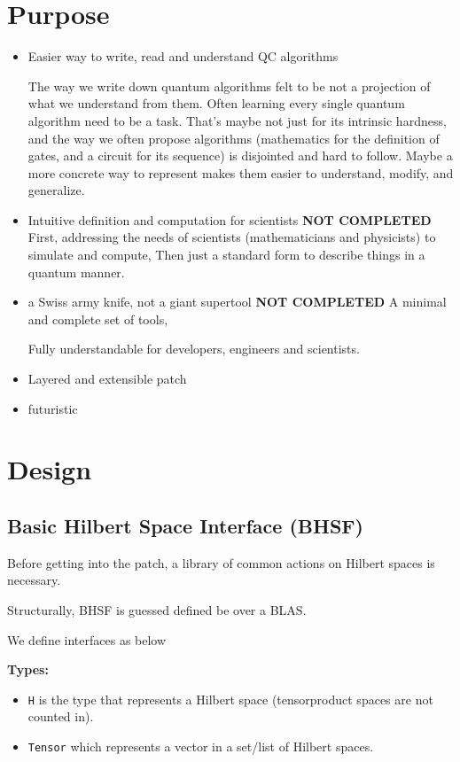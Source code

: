 \documentclass[a4paper,11pt]{article}
\def\co{\lstinline}
\begin{document}
\section{Purpose}
\begin{itemize}
\item Easier way to write, read and understand QC algorithms

The way we write down quantum algorithms felt to be not a projection of what we understand from them. Often learning every single quantum algorithm need to be a task. That's maybe not just for its intrinsic hardness, and the way we often propose algorithms (mathematics for the definition of gates, and a circuit for its sequence) is disjointed and hard to follow. Maybe a more concrete way to represent makes them easier to understand, modify, and generalize.


\item Intuitive definition and computation for scientists
\textbf{NOT COMPLETED}
First, addressing the needs of scientists (mathematicians and physicists) to simulate and compute,
Then just a standard form to describe things in a quantum manner.

\item a Swiss army knife, not a giant supertool
\textbf{NOT COMPLETED}
A minimal and complete set of tools, 

Fully understandable for developers, engineers and scientists.

\item Layered and extensible patch

\item futuristic
\end{itemize}

\section{Design}

\subsection{Basic Hilbert Space Interface (BHSF)}
Before getting into the patch, a library of common actions on Hilbert spaces is necessary.

Structurally, BHSF is guessed defined be over a BLAS.

We define interfaces as below

\clearpage

\textbf{Types: }
\begin{itemize}
    \item \co|H| is the type that represents a Hilbert space (tensorproduct spaces are not counted in).
	\item \co|Tensor| which represents a vector in a set/list of Hilbert spaces.
\end{itemize}
\end{document}
